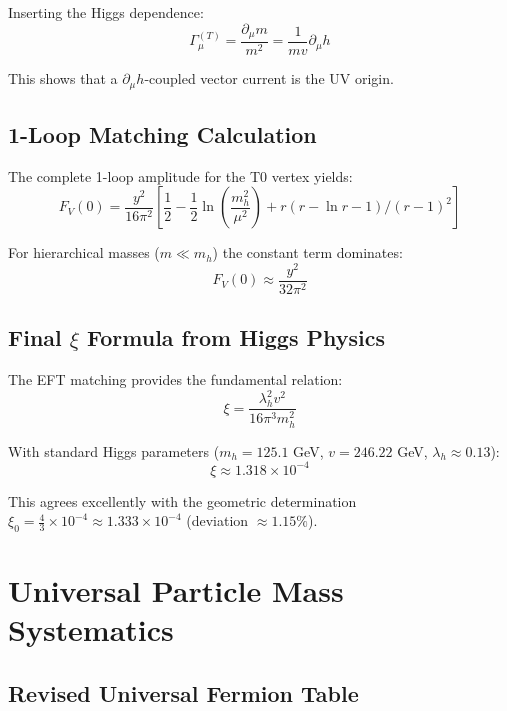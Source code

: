 	Inserting the Higgs dependence:
	\begin{equation}
		\Gamma_\mu^{(T)} = \frac{\partial_\mu m}{m^2} = \frac{1}{mv}\partial_\mu h
	\end{equation}
	
	This shows that a $\partial_\mu h$-coupled vector current is the UV origin.
	
	\subsection{1-Loop Matching Calculation}
	\label{subsec:one_loop_matching}
	
	The complete 1-loop amplitude for the T0 vertex yields:
	\begin{equation}
		F_V(0) = \frac{y^2}{16\pi^2}\left[\frac{1}{2} - \frac{1}{2}\ln\left(\frac{m_h^2}{\mu^2}\right) + r(r-\ln r-1)/(r-1)^2\right]
	\end{equation}
	
	For hierarchical masses ($m \ll m_h$) the constant term dominates:
	\begin{equation}
		F_V(0) \approx \frac{y^2}{32\pi^2}
	\end{equation}
	
	\subsection{Final $\xi$ Formula from Higgs Physics}
	\label{subsec:final_xi_formula}
	
	The EFT matching provides the fundamental relation:
	\begin{equation}
		\boxed{\xi = \frac{\lambda_h^2 v^2}{16\pi^3 m_h^2}}
	\end{equation}
	
	With standard Higgs parameters ($m_h = 125.1$ GeV, $v = 246.22$ GeV, $\lambda_h \approx 0.13$):
	\begin{equation}
		\xi \approx 1.318 \times 10^{-4}
	\end{equation}
	
	This agrees excellently with the geometric determination $\xi_0 = \frac{4}{3} \times 10^{-4} \approx 1.333 \times 10^{-4}$ (deviation $\approx 1.15\%$).
	
	\section{Universal Particle Mass Systematics}
	\label{sec:universal_masses}
	
	\subsection{Revised Universal Fermion Table}
	\label{subsec:universal_table}
	
